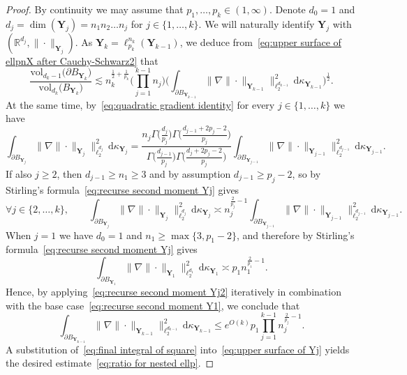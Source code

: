 \documentclass[11pt,reqno]{amsart}
\renewcommand{\le}{\leqslant}
\renewcommand{\ge}{\geqslant}
\newcommand{\ud}[0]{\,\mathrm{d}}
\renewcommand{\k}{\{1,\ldots,k\}}
\newcommand{\Y}{\mathbf Y}
\newcommand{\R}{\mathbb R}
\theoremstyle{remark}
\newcommand{\vol}{\mathrm{vol}}
\renewcommand{\1}{\mathbf 1}
\begin{document}
\begin{proof}
By continuity we may assume that $p_1,\ldots,p_k\in (1,\infty)$. Denote $d_0=1$ and $d_j=\dim(\Y_j)=n_1n_2\ldots n_j$ for $j\in \k$. We will naturally identify $\Y_j$ with $(\R^{d_j},\|\cdot\|_{\Y_j})$. As $\Y_k=\ell_{p_k}^{n_k}(\Y_{k-1})$,  we deduce from~\eqref{eq:upper surface of ellpnX after Cauchy-Schwarz2} that
\begin{equation}\label{eq:upper surface of Yj}
\frac{\vol_{d_k-1}\big(\partial B_{\Y_k}\big)}{\vol_{d_k}\big(B_{\Y_k}\big)}\lesssim n_k^{\frac12+\frac{1}{p_k}}\bigg(\prod_{j=1}^{k-1}n_j\bigg)\bigg(\int_{\partial B_{\Y_{k-1}}} \big\|\nabla\|\cdot\|_{\Y_{k-1}}\big\|_{\ell_2^{d_{k-1}}}^2\ud\kappa_{\Y_{k-1}}\bigg)^{\frac12}.
\end{equation}
At the same time, by~\eqref{eq:quadratic gradient identity} for every $j\in \k$ we have
\begin{equation}\label{eq:recurse second moment Yj}
\int_{\partial B_{\Y_j}} \big\|\nabla \|\cdot\|_{\Y_j}\big\|^2_{\ell_2^{d_j}}\ud \kappa_{\Y_j}=\frac{n_j\Gamma\big(\frac{d_j}{p_j}\big)\Gamma\big(\frac{d_{j-1}+2p_j-2}{p_j}\big)}{\Gamma\big(\frac{d_{j-1}}{p_j}\big)
\Gamma\big(\frac{d_j+2p_j-2}{p_j}\big)}\int_{\partial B_{\Y_{j-1}}} \big\|\nabla\|\cdot\|_{\Y_{j-1}}\big\|_{\ell_2^{d_{j-1}}}^2\ud\kappa_{\Y_{j-1}}.
\end{equation}
If also $j\ge 2$, then $d_{j-1}\ge n_1\ge 3$ and by assumption $d_{j-1}\ge p_j-2$, so by Stirling's formula~\eqref{eq:recurse second moment Yj} gives
\begin{equation}\label{eq:recurse second moment Yj2}
\forall j\in \{2,\ldots,k\},\qquad \int_{\partial B_{\Y_j}} \big\|\nabla \|\cdot\|_{\Y_j}\big\|^2_{\ell_2^{d_j}}\ud \kappa_{\Y_j}\asymp n_j^{\frac{2}{p_j}-1}\int_{\partial B_{\Y_{j-1}}} \big\|\nabla\|\cdot\|_{\Y_{j-1}}\big\|_{\ell_2^{d_{j-1}}}^2\ud\kappa_{\Y_{j-1}}.
\end{equation}
When $j=1$ we have $d_0=1$ and  $n_1\ge \max\{3,p_1-2\}$, and therefore by Stirling's formula~\eqref{eq:recurse second moment Yj} gives
\begin{equation}\label{eq:recurse second moment Y1}
\int_{\partial B_{\Y_1}} \big\|\nabla \|\cdot\|_{\Y_1}\big\|^2_{\ell_2^{d_1}}\ud \kappa_{\Y_1}\asymp p_1n_1^{\frac{2}{p_1}-1}.
\end{equation}
Hence, by applying~\eqref{eq:recurse second moment Yj2} iteratively in combination with the base case~\eqref{eq:recurse second moment Y1}, we conclude that
\begin{equation}\label{eq:final integral of square}
\int_{\partial B_{\Y_{k-1}}} \big\|\nabla\|\cdot\|_{\Y_{k-1}}\big\|_{\ell_2^{d_{k-1}}}^2\ud\kappa_{\Y_{k-1}}\le e^{O(k)}p_1\prod_{j=1}^{k-1}  n_j^{\frac{2}{p_j}-1}.
\end{equation}
A substitution of~\eqref{eq:final integral of square} into~\eqref{eq:upper surface of Yj} yields the desired estimate~\eqref{eq:ratio for nested ellp}.



\end{proof}
\end{document}
